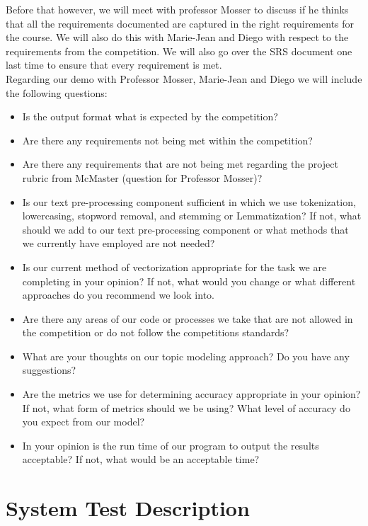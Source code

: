 \documentclass[12pt, titlepage]{article}
\begin{document}
  Before that however, we will meet with professor Mosser to discuss if he thinks that all the requirements documented are captured in the right requirements for the course. We will also do this with Marie-Jean and Diego with respect to the requirements from the competition. We will also go over the SRS document one last time to ensure that every requirement is met. \\
  
  
  Regarding our demo with Professor Mosser, Marie-Jean and Diego we will include the following questions:
  
  \begin{itemize}
  \item Is the output format what is expected by the competition?
  \item Are there any requirements not being met within the competition?
  \item Are there any requirements that are not being met regarding the project rubric from McMaster (question for Professor Mosser)?
  \item Is our text pre-processing component sufficient in which we use tokenization, lowercasing, stopword removal, and stemming or Lemmatization? If not, what should we add to our text pre-processing component or what methods that we currently have employed are not needed?
  \item Is our current method of vectorization appropriate for the task we are completing in your opinion? If not, what would you change or what different approaches do you recommend we look into.
  \item Are there any areas of our code or processes we take that are not allowed in the competition or do not follow the competitions standards?
  \item What are your thoughts on our topic modeling approach? Do you have any suggestions?
  \item Are the metrics we use for determining accuracy appropriate in your opinion? If not, what form of metrics should we be using?
  What level of accuracy do you expect from our model?
  \item In your opinion is the run time of our program to output the results acceptable? If not, what would be an acceptable time?\end{itemize}
  

\section{System Test Description}
	
\end{document}
